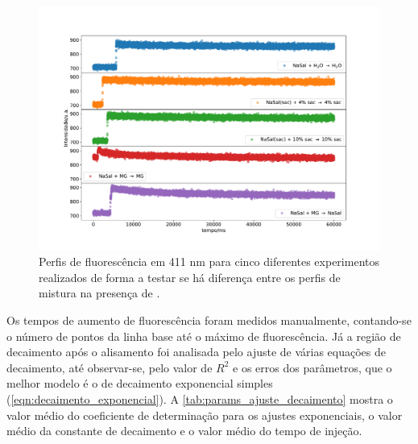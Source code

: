 	\begin{figure}[h]
		\centering
		\includegraphics[width=\textwidth]{imagens/fluor/fluorescencia_comparativo}
		\caption{Perfis de fluorescência em 411 nm para cinco diferentes experimentos realizados de forma a testar se há diferença entre os perfis de mistura na presença de \TTAB.}
		\label{fig:fluorescencia_comparativo_cineticas}
	\end{figure}
	
	Os tempos de aumento de fluorescência foram medidos manualmente, contando-se o número de pontos da linha base até o máximo de fluorescência. Já a região de decaimento após o alisamento foi analisada pelo ajuste de várias equações de decaimento, até observar-se, pelo valor de \(R^2\) e os erros dos parâmetros, que o melhor modelo é o de decaimento exponencial simples (\autoref{eqn:decaimento_exponencial}). A \autoref{tab:params_ajuste_decaimento} mostra o valor médio do coeficiente de determinação para os ajustes exponenciais, o valor médio da constante de decaimento e o valor médio do tempo de injeção.
	
